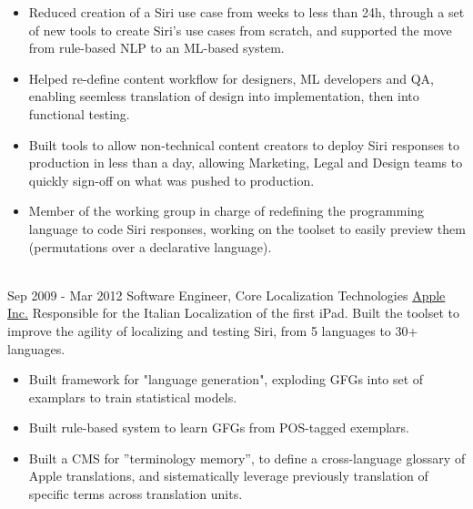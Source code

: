 \documentclass[letterpaper]{twentysecondcv} %
\begin{document}
\begin{twenty}
{{\begin{itemize}
        \item Reduced creation of a Siri use case from weeks to less than 24h, through a set of new tools to create Siri's use cases from scratch, and supported the move from rule-based NLP to an ML-based system.
        \item Helped re-define content workflow for designers, ML developers and QA, enabling seemless translation of design into implementation, then into functional testing.
        \item Built tools to allow non-technical content creators to deploy Siri responses to production in less than a day, allowing Marketing, Legal and Design teams to quickly sign-off on what was pushed to production.
        \item Member of the working group in charge of redefining the programming language to code Siri responses, working on the toolset to easily preview them (permutations over a declarative language).
        \end{itemize}}
        }
    \\
  \twentyitem
      {Sep 2009 -}
    {Mar 2012}
        {Software Engineer, Core Localization Technologies}
        {\href{http://www.apple.com}{Apple Inc.}}
        {Responsible for the Italian Localization of the first iPad. Built the toolset to improve the agility of localizing and testing Siri, from 5 languages to 30+ languages.}
        {
        {\begin{itemize}
        \item Built framework for "language generation", exploding GFGs into set of examplars to train statistical models.
        \item Built rule-based system to learn GFGs from POS-tagged exemplars.
        \item Built a CMS for ”terminology memory”, to define a cross-language glossary of Apple translations, and sistematically leverage previously translation of specific terms across translation units.
        \end{itemize}}
        }
    \\ 

\end{twenty}
\end{document}
